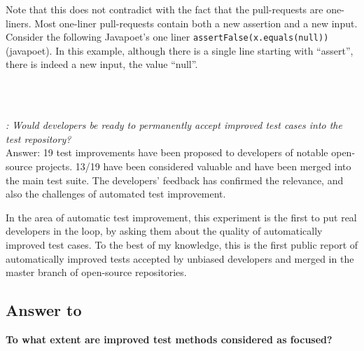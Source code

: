 Note that this does not contradict with the fact that the pull-requests are one-liners.
Most one-liner pull-requests contain both a new assertion and a new input. Consider the following Javapoet's one liner \texttt{assertFalse(x.equals(null))} (javapoet). 
In this example, although there is a single line starting with ``assert'', there is indeed a new input, the value ``null''.

~\\
~\\
\begin{mdframed}
	\textit{\rqpullrequest: Would developers be ready to permanently accept improved test cases into the test repository?}\\
	Answer: 19 test improvements have been proposed to developers of notable open-source projects. 
	13/19 have been considered valuable and have been merged into the main test suite. 
	The developers' feedback has confirmed the relevance, and also the challenges of automated test improvement.
\end{mdframed}

In the area of automatic test improvement, this experiment is the first to put real developers in the loop, by asking them about the quality of automatically improved test cases.
To the best of my knowledge, this is the first public report of automatically improved tests accepted by unbiased developers and merged in the master branch of open-source repositories.




\subsection{Answer to \rqcandidates{}}
\label{subsec:test-improvement:experiment-results:rq2}

\textbf{\rqcandidates{} To what extent are improved test methods considered as focused?}

